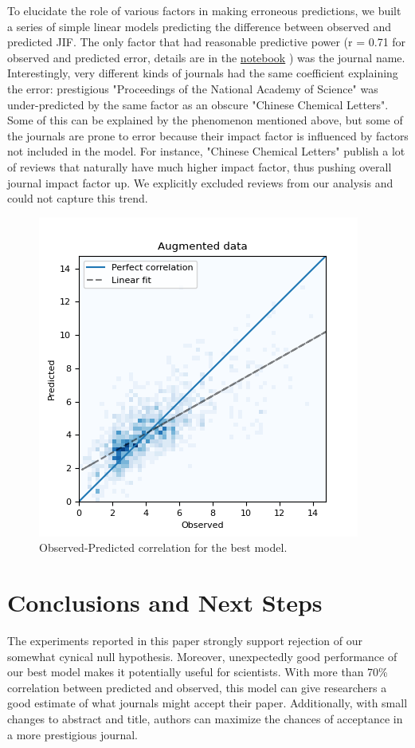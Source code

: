 \documentclass[11pt]{article}
\begin{document}
To elucidate the role of various factors in making erroneous predictions, we built a series of simple linear models predicting the difference between observed and predicted JIF. The only factor that had reasonable predictive power (r = 0.71 for observed and predicted error, details are in the \href{https://github.com/ArtemChemist/w266_project/blob/main/Postmortem.ipynb}{notebook} ) was the journal name. Interestingly, very different kinds of journals had the same coefficient explaining the error: prestigious "Proceedings of the National Academy of Science" was under-predicted by the same factor as an obscure "Chinese Chemical Letters". Some of this can be explained by the phenomenon mentioned above, but some of the journals are prone to error because their impact factor is influenced by factors not included in the model. For instance, "Chinese Chemical Letters" publish a lot of reviews that naturally have much higher impact factor, thus pushing overall journal impact factor up. We explicitly excluded reviews from our analysis and could not capture this trend.
\begin{figure}
	\includegraphics[width= \columnwidth]{./Images/Best model.png}
	\caption{Observed-Predicted correlation for the best model.}
	\label{fig:best_model_corr}
\end{figure}
\section{Conclusions and Next Steps}
The experiments reported in this paper strongly support rejection of our somewhat cynical null hypothesis. Moreover, unexpectedly good performance of our best model makes it potentially useful for scientists. With more than 70\% correlation between predicted and observed, this model can give researchers a good estimate of what journals might accept their paper. Additionally, with small changes to abstract and title, authors can maximize the chances of acceptance in a more prestigious journal. 
\end{document}

